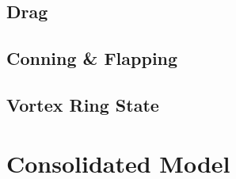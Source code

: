 \subsection{Drag}
\label{subsec:dynamics.aero.drag}
\subsection{Conning \& Flapping}
\label{subsec:dynamics.aero.flap}
\subsection{Vortex Ring State}
\label{subsec:dynamics.aero.vrs}

\section{Consolidated Model}
\label{sec:dynamics.model}